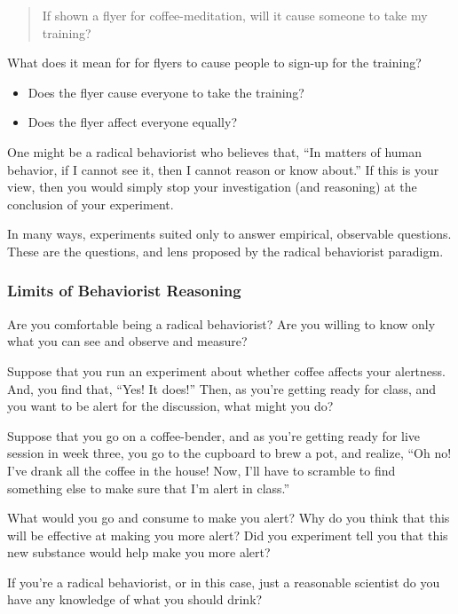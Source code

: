 \documentclass[
]{article}
\providecommand{\tightlist}{%
  \setlength{\itemsep}{0pt}\setlength{\parskip}{0pt}}
\theoremstyle{definition}
\theoremstyle{definition}
\theoremstyle{definition}
\theoremstyle{definition}
\theoremstyle{remark}
\begin{document}
\begin{quote}
If shown a flyer for coffee-meditation, will it cause someone to take my training?
\end{quote}

What does it mean for for flyers to cause people to sign-up for the training?

\begin{itemize}
\tightlist
\item
  Does the flyer cause everyone to take the training?
\item
  Does the flyer affect everyone equally?
\end{itemize}

One might be a radical behaviorist who believes that, ``In matters of human behavior, if I cannot see it, then I cannot reason or know about.'' If this is your view, then you would simply stop your investigation (and reasoning) at the conclusion of your experiment.

In many ways, experiments suited only to answer empirical, observable questions. These are the questions, and lens proposed by the radical behaviorist paradigm.

\subsubsection{Limits of Behaviorist Reasoning}\label{limits-of-behaviorist-reasoning}

Are you comfortable being a radical behaviorist? Are you willing to know only what you can see and observe and measure?

Suppose that you run an experiment about whether coffee affects your alertness. And, you find that, ``Yes! It does!'' Then, as you're getting ready for class, and you want to be alert for the discussion, what might you do?

Suppose that you go on a coffee-bender, and as you're getting ready for live session in week three, you go to the cupboard to brew a pot, and realize, ``Oh no! I've drank all the coffee in the house! Now, I'll have to scramble to find something else to make sure that I'm alert in class.''

What would you go and consume to make you alert? Why do you think that this will be effective at making you more alert? Did you experiment tell you that this new substance would help make you more alert?

If you're a radical behaviorist, or in this case, just a reasonable scientist do you have any knowledge of what you should drink?
\end{document}
